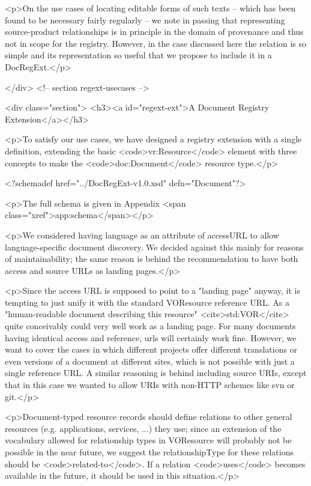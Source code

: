 <p>On the use cases of locating editable forms of such texts – which
has been found to be necessary fairly regularly – we note in passing
that representing source-product relationships is in principle in the
domain of provenance and thus not in scope for the registry. However, in
the case discussed here the relation is so simple and its representation
so useful that we propose to include it in a DocRegExt.</p>

</div> <!-- section regext-usecases -->


<div class="section">
<h3><a id="regext-ext">A Document Registry Extension</a></h3>

<p>To satisfy our use cases, we have designed a registry extension with
a single definition, extending the basic <code>vr:Resource</code>
element with three concepts to make the <code>doc:Document</code>
resource type.</p>

<?schemadef href="../DocRegExt-v1.0.xsd" defn="Document"?>

<p>The full schema is given in Appendix <span
class="xref">app:schema</span></p>

<p>We considered  having language as an attribute of accessURL to allow
language-specific document discovery.  We decided against this mainly
for reasons of maintainability; the same reason is behind the
recommendation to have both access and source URLs as landing pages.</p>

<p>Since the access URL is supposed to point to a "landing page" anyway,
it is tempting to just unify it with the standard VOResource reference
URL. As a "human-readable document describing this resource"
<cite>std:VOR</cite> quite conceivably could very well work as a landing
page.  For many documents having identical access and reference, urls
will certainly work fine.  However, we want to cover the cases in
which different projects offer different translations or even versions
of a document at different sites, which is not possible with just a
single reference URL.  A similar reasoning is behind including source
URIs, except that in this case we wanted to allow URIs with non-HTTP
schemes like svn or git.</p>

<p>Document-typed resource records should define relations to other
general resources (e.g. applications, services, ...) 
they use; since an extension of the vocabulary allowed for relationship types
in VOResource will probably not be possible in the near future,
we suggest the relationshipType for these relations should be
<code>related-to</code>.  If a relation <code>uses</code> becomes available
in the future, it should be used in this situation.</p>

